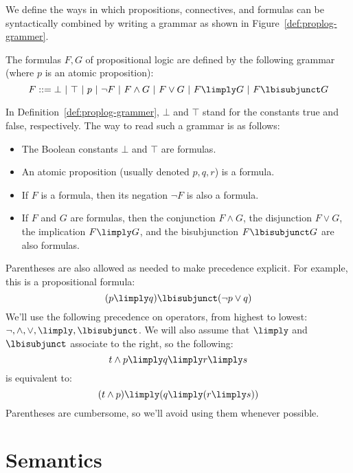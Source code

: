 \documentclass[11pt,twoside]{scrartcl}
\newcommand{\bebecomes}{\mathrel{::=}}
\newcommand{\alternative}{~|~}
\begin{document}
We define the ways in which propositions, connectives, and formulas can be syntactically combined by writing a grammar as shown in Figure~\ref{def:proplog-grammer}.

\begin{definition}
\label{def:proplog-grammer}
  The formulas $F,G$ of propositional logic are defined by the following grammar (where $p$ is an atomic proposition):
  \[
  F \bebecomes \bot \alternative \top \alternative p \alternative \lnot F \alternative F\land G \alternative F\lor G \alternative F\limply G \alternative F \lbisubjunct G
  \]
\end{definition}
In Definition~\ref{def:proplog-grammer}, $\bot$ and $\top$ stand for the constants true and false, respectively. 
The way to read such a grammar is as follows:
\begin{itemize} 
  \item The Boolean constants $\bot$ and $\top$ are formulas.
  \item An atomic proposition (usually denoted $p,q,r$) is a formula.
  \item If $F$ is a formula, then its negation $\lnot F$ is also a formula.
  \item If $F$ and $G$ are formulas, then the conjunction $F\land G$, the disjunction $F\lor G$, the implication $F \limply G$, and the bisubjunction $F\lbisubjunct G$ are also formulas.
\end{itemize}
Parentheses are also allowed as needed to make precedence explicit. For example, this is a propositional formula:
\begin{equation}
(p \limply q) \lbisubjunct (\lnot p \lor q)
\label{eq:ex1}
\end{equation}
We'll use the following precedence on operators, from highest to lowest: $\lnot, \land, \lor, \limply, \lbisubjunct$. We will also assume that $\limply$ and $\lbisubjunct$ associate to the right, so the following:
\begin{equation}
t \land p \limply q \limply r \limply s
\end{equation}
is equivalent to:
\begin{equation}
(t \land p) \limply (q \limply (r \limply s))
\end{equation}
Parentheses are cumbersome, so we'll avoid using them whenever possible.


\section{Semantics}
\end{document}
